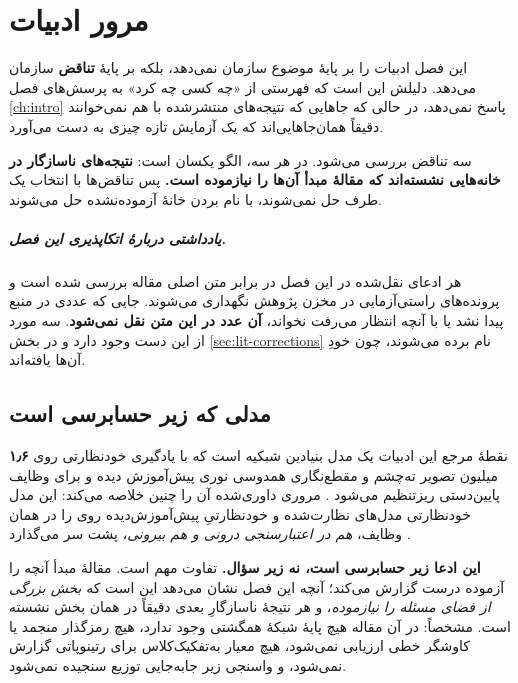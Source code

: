 
\chapter{مرور ادبیات}
\label{ch:related}

این فصل ادبیات را بر پایهٔ موضوع سازمان نمی‌دهد، بلکه بر پایهٔ \textbf{تناقض} سازمان می‌دهد.
دلیلش این است که فهرستی از «چه کسی چه کرد» به پرسش‌های فصل \ref{ch:intro} پاسخ نمی‌دهد، در
حالی که جاهایی که نتیجه‌های منتشرشده با هم نمی‌خوانند دقیقاً همان‌جاهایی‌اند که یک آزمایش تازه
چیزی به دست می‌آورد.

سه تناقض بررسی می‌شود. در هر سه، الگو یکسان است: \textbf{نتیجه‌های ناسازگار در خانه‌هایی
نشسته‌اند که مقالهٔ مبدأ آن‌ها را نیازموده است.} پس تناقض‌ها با انتخاب یک طرف حل نمی‌شوند، با
نام بردن خانهٔ آزموده‌نشده حل می‌شوند.

\paragraph{یادداشتی دربارهٔ اتکاپذیری این فصل.} هر ادعای نقل‌شده در این فصل در برابر متن اصلی
مقاله بررسی شده است و پرونده‌های راستی‌آزمایی در مخزن پژوهش نگهداری می‌شوند. جایی که عددی در
منبع پیدا نشد یا با آنچه انتظار می‌رفت نخواند، \textbf{آن عدد در این متن نقل نمی‌شود}. سه مورد
از این دست وجود دارد و در بخش \ref{sec:lit-corrections} نام برده می‌شوند، چون خودِ آن‌ها
یافته‌اند.

\section{مدلی که زیر حسابرسی است}
\label{sec:retfound-audit}

نقطهٔ مرجع این ادبیات یک مدل بنیادین شبکیه است که با یادگیری خودنظارتی روی \textbf{\num{۱٫۶}}
میلیون تصویر ته‌چشم و مقطع‌نگاری همدوسی نوری پیش‌آموزش دیده و برای وظایف پایین‌دستی ریزتنظیم
می‌شود \cite{zhou2023retfound}. مروری داوری‌شده آن را چنین خلاصه می‌کند: این مدل خودنظارتی
مدل‌های نظارت‌شده و خودنظارتیِ پیش‌آموزش‌دیده روی  را در همان وظایف، \emph{هم در
اعتبارسنجی درونی و هم بیرونی}، پشت سر می‌گذارد \cite{ruamviboonsuk2024review}.

\textbf{این ادعا زیر حسابرسی است، نه زیر سؤال.} تفاوت مهم است. مقالهٔ مبدأ آنچه را آزموده
درست گزارش می‌کند؛ آنچه این فصل نشان می‌دهد این است که \emph{بخش بزرگی از فضای مسئله را
نیازموده}، و هر نتیجهٔ ناسازگارِ بعدی دقیقاً در همان بخش نشسته است. مشخصاً: در آن مقاله هیچ
پایهٔ شبکهٔ همگشتی وجود ندارد، هیچ رمزگذار منجمد یا کاوشگر خطی ارزیابی نمی‌شود، هیچ معیار
به‌تفکیک‌کلاس برای رتینوپاتی گزارش نمی‌شود، و واسنجی زیر جابه‌جایی توزیع سنجیده نمی‌شود.


